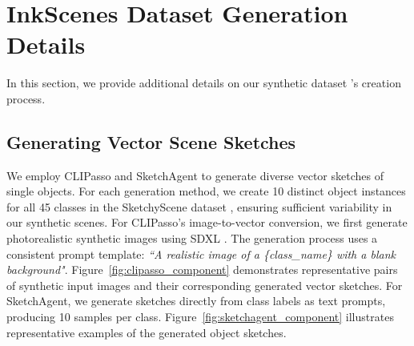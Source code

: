 \section{InkScenes Dataset Generation Details}
In this section, we provide additional details on our synthetic dataset \datasetname{}'s creation process. 

\subsection{Generating Vector Scene Sketches}
We employ CLIPasso  and SketchAgent  to generate diverse vector sketches of single objects. For each generation method, we create 10 distinct object instances for all 45 classes in the SketchyScene dataset , ensuring sufficient variability in our synthetic scenes.
For CLIPasso's image-to-vector conversion, we first generate photorealistic synthetic images using SDXL . The generation process uses a consistent prompt template: \textit{``A realistic image of a \{class\_name\} with a blank background"}. Figure~\ref{fig:clipasso_component} demonstrates representative pairs of synthetic input images and their corresponding generated vector sketches. 
For SketchAgent, we generate sketches directly from class labels as text prompts, producing 10 samples per class. Figure~\ref{fig:sketchagent_component} illustrates representative examples of the generated object sketches.
